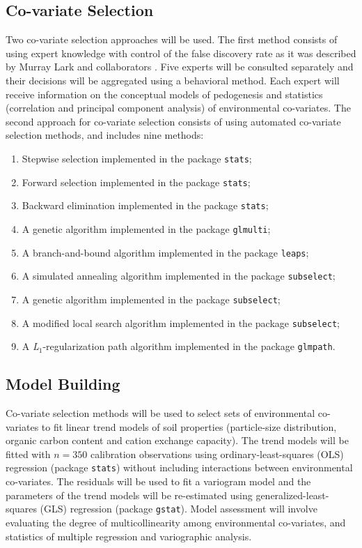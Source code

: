 \subsection{Co-variate Selection}

Two co-variate selection approaches will be used. The first method consists of using expert knowledge with control of the false discovery rate as it was described by Murray Lark and collaborators \cite{LarkEtAl2007a}. Five experts will be consulted separately and their decisions will be aggregated using a behavioral method. Each expert will receive information on the conceptual models of pedogenesis and statistics (correlation and principal component analysis) of environmental co-variates. The second approach for co-variate selection consists of using automated co-variate selection methods, and includes nine methods:

\begin{enumerate}
\item Stepwise selection implemented in the package \texttt{stats};
\item Forward selection implemented in the package \texttt{stats};
\item Backward elimination implemented in the package \texttt{stats};
\item A genetic algorithm implemented in the package \texttt{glmulti};
\item A branch-and-bound algorithm implemented in the package \texttt{leaps};
\item A simulated annealing algorithm implemented in the package \texttt{subselect};
\item A genetic algorithm implemented in the package \texttt{subselect};
\item A modifi{}ed local search algorithm implemented in the package \texttt{subselect};
\item A \textit{L}$_{1}$-regularization path algorithm implemented in the
package \texttt{glmpath}.
\end{enumerate}

\subsection{Model Building}

Co-variate selection methods will be used to select sets of environmental co-variates to fit linear trend models of soil properties (particle-size distribution, organic carbon content and cation exchange capacity). The trend models will be fitted with $n=350$ calibration observations using ordinary-least-squares (OLS) regression (package \texttt{stats}) without including interactions between environmental co-variates. The residuals will be used to fit a variogram model and the parameters of the trend models will be re-estimated using generalized-least-squares (GLS) regression (package \texttt{gstat}). Model assessment will involve evaluating the degree of multicollinearity among environmental co-variates, and statistics of multiple regression and variographic analysis.

